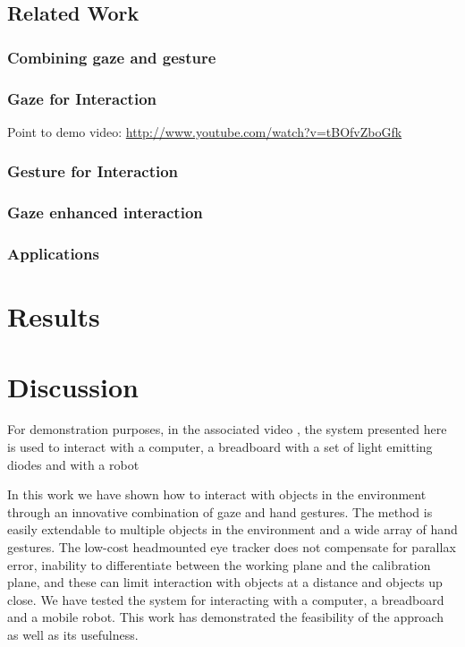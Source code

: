 \documentclass[jou,a4paper,notxfonts]{apa}
\begin{document}
\subsection{Related Work}



\subsubsection{Combining gaze and gesture}
\subsubsection{Gaze for Interaction}
Point to demo video: \url{http://www.youtube.com/watch?v=tBOfvZboGfk}
\subsubsection{Gesture for Interaction}
%
\subsubsection{Gaze enhanced interaction }
\subsubsection{Applications}

\section{Results}


\section{Discussion}

For demonstration purposes, in the associated video \cite{gazetrackinglassesandhandgesturerecognitionVideo}, the system
presented here is used to interact with a computer, a breadboard with a set of light emitting diodes and with a robot


In this work we have shown how to interact with objects in the environment through an innovative combination of
gaze and hand gestures. The method is easily extendable to multiple objects in the environment and a wide array of hand
gestures. The low-cost headmounted eye tracker does not compensate for parallax error, inability to differentiate
between the working plane and the calibration plane, and these can limit interaction with objects at a distance and
objects up close. We have tested the system  for interacting with a computer,  a breadboard and a mobile robot.
This work has demonstrated the feasibility of the approach as well as its usefulness.



\end{document}
